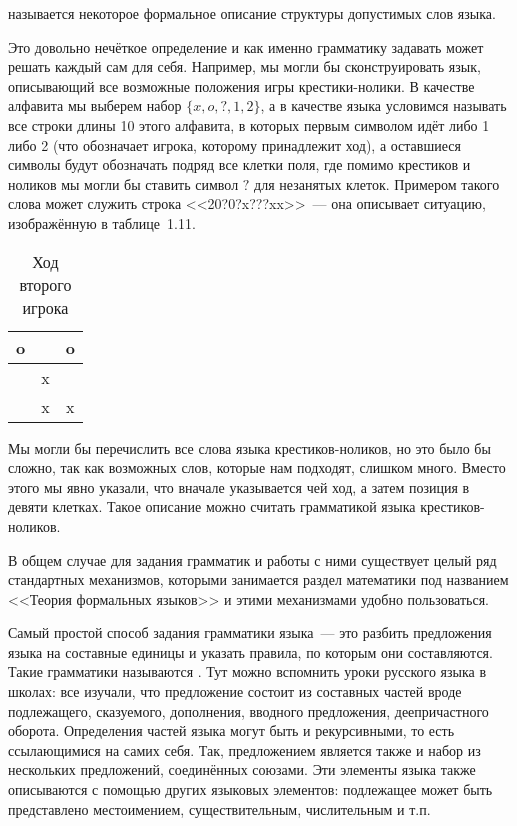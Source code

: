 \begin{definition}
 называется некоторое формальное описание структуры допустимых слов языка.
\end{definition}

Это довольно нечёткое определение и как именно грамматику задавать может решать каждый сам для себя. Например, мы могли бы сконструировать язык, описывающий все возможные положения игры крестики-нолики. В качестве алфавита мы выберем набор $\{x, o, ?,1, 2\}$, а в качестве языка условимся называть все строки длины 10 этого алфавита, в которых первым символом идёт либо 1 либо 2 (что обозначает игрока, которому принадлежит ход), а оставшиеся символы будут обозначать подряд все клетки поля, где помимо крестиков и ноликов мы могли бы ставить символ $?$ для незанятых клеток. Примером такого слова может служить строка <<20?0?x???xx>>~--- она описывает ситуацию, изображённую в таблице~1.11.

\begin{table}[h]
\centering
\begin{tabular}{c | c | c}
o & & o\\
\hline
  & x & \\
\hline
 & x & x
\end{tabular}
\caption{Ход второго игрока}
\end{table}

Мы могли бы перечислить все слова языка крестиков-ноликов, но это было бы сложно, так как возможных слов, которые нам подходят, слишком много. Вместо этого мы явно указали, что вначале указывается чей ход, а затем позиция в девяти клетках. Такое описание можно считать грамматикой языка крестиков-ноликов.

В общем случае для задания грамматик и работы с ними существует целый ряд стандартных механизмов, которыми занимается раздел математики под названием <<Теория формальных языков>> и этими механизмами удобно пользоваться.

Самый простой способ задания грамматики языка~--- это разбить предложения языка на составные единицы и указать правила, по которым они составляются. Такие грамматики называются . Тут можно вспомнить уроки русского языка в школах: все изучали, что предложение состоит из составных частей вроде подлежащего, сказуемого, дополнения, вводного предложения, деепричастного оборота. Определения частей языка могут быть и рекурсивными, то есть ссылающимися на самих себя. Так, предложением является также и набор из нескольких предложений, соединённых союзами. Эти элементы языка также описываются с помощью других языковых элементов: подлежащее может быть представлено местоимением, существительным, числительным и т.п.

